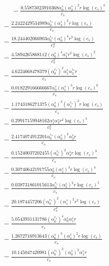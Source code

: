 \documentclass[10pt]{article}
\begin{document}
\begin{align*}
\phantom{R_{0,8}} &\phantom{={}}{}  - \frac{0.55873023910368 \alpha_{0}^s \left(\alpha_{2}^s\right)^{2} r \log{\left(c_{s} \right)}^{3}}{c_{s}} \\
&{}  - \frac{2.2422429534989 \alpha_{0}^{c_s} \left(\alpha_{2}^s\right)^{2} r \log{\left(c_{s} \right)}}{c_{s}} \\
&{}  - \frac{18.244402066903 \alpha_{0}^{c_s} \left(\alpha_{0}^s\right)^{4} r^{3} \log{\left(c_{s} \right)}}{c_{s}^{3}} \\
&{}  - \frac{4.5894265868112 \left(\alpha_{0}^s\right)^{4} \alpha_{1}^s r^{2} \log{\left(c_{s} \right)}^{2}}{c_{s}^{2}} \\
&{}  - \frac{4.6224668478379 \left(\alpha_{0}^{c_s}\right)^{2} \alpha_{1}^s \alpha_{2}^{c_s} r}{c_{s}} \\
&{}  - \frac{0.018229166666667 \alpha_{0}^s \left(\alpha_{1}^s\right)^{3} r \log{\left(c_{s} \right)}^{6}}{c_{s}} \\
&{}  - \frac{1.1743186271375 \left(\alpha_{0}^s\right)^{3} \left(\alpha_{1}^{c_s}\right)^{2} r \log{\left(c_{s} \right)}}{c_{s}} \\
&{}  - \frac{0.29917159948162 \alpha_{1}^s \alpha_{3}^s r^{2} \log{\left(c_{s} \right)}^{3}}{c_{s}^{2}} \\
&{}  - \frac{2.4174074912201 \alpha_{0}^{c_s} \left(\alpha_{0}^s\right)^{2} \alpha_{3}^s r}{c_{s}} \\
&{}  - \frac{0.15240037202455 \left(\alpha_{0}^{c_s}\right)^{2} \alpha_{4}^s r \log{\left(c_{s} \right)}^{3}}{c_{s}} \\
&{}  - \frac{0.30740642191755 \alpha_{0}^s \left(\alpha_{1}^s\right)^{3} r \log{\left(c_{s} \right)}^{4}}{c_{s}} \\
&{}  - \frac{0.038731861015613 \alpha_{0}^{c_s} \left(\alpha_{2}^s\right)^{2} r \log{\left(c_{s} \right)}^{5}}{c_{s}} \\
&{}  - \frac{20.1874457206 \left(\alpha_{0}^{c_s}\right)^{2} \left(\alpha_{1}^s\right)^{2} r^{2} \log{\left(c_{s} \right)}}{c_{s}^{2}} \\
&{}  - \frac{5.0543931131786 \left(\alpha_{0}^{c_s}\right)^{4} \alpha_{0}^s \alpha_{1}^s r}{c_{s}} \\
&{}  - \frac{1.2672716913643 \left(\alpha_{0}^s\right)^{3} \left(\alpha_{1}^s\right)^{2} r \log{\left(c_{s} \right)}}{c_{s}} \\
&{}  - \frac{10.145047420981 \left(\alpha_{0}^{c_s}\right)^{3} \left(\alpha_{0}^s\right)^{2} \alpha_{1}^s r}{c_{s}} \\

\end{align*}
\end{document}
